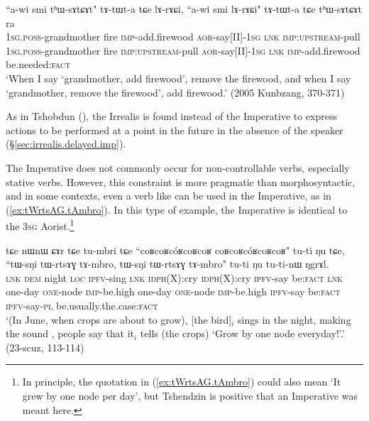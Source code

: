 \begin{exe}
\ex \label{ex:thWsAtCAt.lArACi}
\gll ``a-wi smi tʰɯ-sɤtɕɤt" tɤ-tɯt-a tɕe lɤ-rɤɕi, ``a-wi smi lɤ-rɤɕi" tɤ-tɯt-a tɕe tʰɯ-sɤtɕɤt ra \\
\textsc{1sg}.\textsc{poss}-grandmother fire \textsc{imp}-add.firewood \textsc{aor}-say[II]-\textsc{1sg} \textsc{lnk} \textsc{imp}:\textsc{upstream}-pull \textsc{1sg}.\textsc{poss}-grandmother fire \textsc{imp}:\textsc{upstream}-pull  \textsc{aor}-say[II]-\textsc{1sg} \textsc{lnk} \textsc{imp}-add.firewood be.needed:\textsc{fact} \\
\glt `When I say `grandmother, add firewood', remove the firewood, and when I say `grandmother, remove the firewood', add firewood.' (2005 Kunbzang, 370-371) 
\end{exe}

As in Tshobdun (\citealt[809]{jackson07irrealis}), the Irrealis is found instead of the Imperative to express actions to be performed at a point in the future in the absence of the speaker (§\ref{sec:irrealis.delayed.imp}). 

The Imperative does not commonly occur for non-controllable verbs, especially stative verbs. However, this constraint is more pragmatic than morphosyntactic, and in some contexts, even a verb like  can be used in the Imperative, as in (\ref{ex:tWrtsAG.tAmbro}). In this type of example, the Imperative  is identical to the \textsc{3sg} Aorist.\footnote{In principle, the quotation in (\ref{ex:tWrtsAG.tAmbro}) could also mean `It grew by one node per day', but Tshendzin is positive that an Imperative was meant here. }

\begin{exe}
\ex \label{ex:tWrtsAG.tAmbro}
\gll tɕe nɯnɯ ɕɤr tɕe tu-mbri tɕe ``coʁcoʁcóʁcoʁcoʁ coʁcoʁcóʁcoʁcoʁ" tu-ti ŋu tɕe, ``tɯ-sŋi tɯ-rtsɤɣ tɤ-mbro, tɯ-sŋi tɯ-rtsɤɣ tɤ-mbro" tu-ti ŋu tu-ti-nɯ ŋgrɤl. \\
\textsc{lnk} \textsc{dem} night \textsc{loc} \textsc{ipfv}-sing \textsc{lnk} \textsc{idph}(X):cry  \textsc{idph}(X):cry \textsc{ipfv}-say be:\textsc{fact} \textsc{lnk} one-day \textsc{one}-node \textsc{imp}-be.high one-day \textsc{one}-node \textsc{imp}-be.high \textsc{ipfv}-say be:\textsc{fact} \textsc{ipfv}-say-\textsc{pl} be.usually.the.case:\textsc{fact}  \\
\glt `(In June, when crops are about to grow), [the  bird]$_i$ sings in the night, making the sound , people say that it$_i$  tells (the crops) `Grow by one node everyday!'.' (23-scuz, 113-114)
\end{exe}

